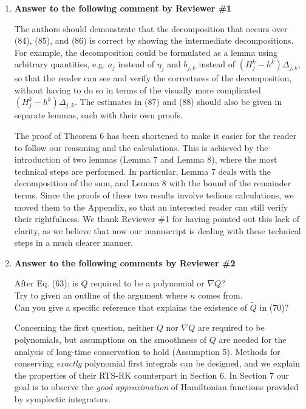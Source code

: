 \documentclass[10pt]{article}
\begin{document}
\begin{enumerate}
	\item \textbf{Answer to the following comment by Reviewer \#1}
	\begin{itquote}
		The authors should demonstrate that the decomposition that occurs over (84), (85), and (86) is correct by showing the intermediate decompositions. For example, the decomposition could be formulated as a lemma using arbitrary quantities, e.g. $a_j$ instead of $\eta_j$ and $b_{j,k}$ instead of $(H^k_j-h^k)\Delta_{j,k}$, so that the reader can see and verify the correctness of the decomposition, without having to do so in terms of the visually more complicated $(H^k_j-h^k)\Delta_{j,k}$. The estimates in (87) and (88) should also be given in separate lemmas, each with their own proofs.
	\end{itquote}
	The proof of Theorem 6 has been shortened to make it easier for the reader to follow our reasoning and the calculations. This is achieved by the introduction of two lemmas (Lemma 7 and Lemma 8), where the most technical steps are performed. In particular, Lemma 7 deals with the decomposition of the sum, and Lemma 8 with the bound of the remainder terms. Since the proofs of these two results involve tedious calculations, we moved them to the Appendix, so that an interested reader can still verify their rightfulness. We thank Reviewer \#1 for having pointed out this lack of clarity, as we believe that now our manuscript is dealing with these technical steps in a much clearer manner.
	\item \textbf{Answer to the following comments by Reviewer \#2}
	\begin{itquote}
		After Eq. (63): is $Q$ required to be a polynomial or $\nabla Q$?\\
		Try to given an outline of the argument where $\kappa$ comes from.\\
		Can you give a specific reference that explains the existence of $\tilde Q$ in (70)?
	\end{itquote}
	Concerning the first question, neither $Q$ nor $\nabla Q$ are required to be polynomials, but assumptions on the smoothness of $Q$ are needed for the analysis of long-time conservation to hold (Assumption 5). Methods for conserving \textit{exactly} polynomial first integrals can be designed, and we explain the properties of their RTS-RK counterpart in Section 6. In Section 7 our goal is to observe the \textit{good approximation} of Hamiltonian functions provided by symplectic integrators.\\

\end{enumerate}
\end{document}

